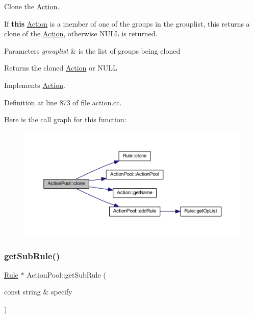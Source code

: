 Clone the \mbox{\hyperlink{class_action}{Action}}. 

If {\bfseries{this}} \mbox{\hyperlink{class_action}{Action}} is a member of one of the groups in the grouplist, this returns a clone of the \mbox{\hyperlink{class_action}{Action}}, otherwise N\+U\+LL is returned. 
\begin{DoxyParams}{Parameters}
{\em grouplist} & is the list of groups being cloned \\
\hline
\end{DoxyParams}
\begin{DoxyReturn}{Returns}
the cloned \mbox{\hyperlink{class_action}{Action}} or N\+U\+LL 
\end{DoxyReturn}


Implements \mbox{\hyperlink{class_action_af8242e41d09e5df52f97df9e65cc626f}{Action}}.



Definition at line 873 of file action.\+cc.

Here is the call graph for this function\+:
\nopagebreak
\begin{figure}[H]
\begin{center}
\leavevmode
\includegraphics[width=350pt]{class_action_pool_a96a6ada9201cdf36d2ed452d0c831725_cgraph}
\end{center}
\end{figure}
\mbox{\label{class_action_pool_ab3fa9090810784f45c832c641947fb2e}} 
\subsubsection{\texorpdfstring{getSubRule()}{getSubRule()}}
{\footnotesize\ttfamily \mbox{\hyperlink{class_rule}{Rule}} $\ast$ Action\+Pool\+::get\+Sub\+Rule (\begin{DoxyParamCaption}\item[{const string \&}]{specify }\end{DoxyParamCaption})\hspace{0.3cm}{\ttfamily [virtual]}}



